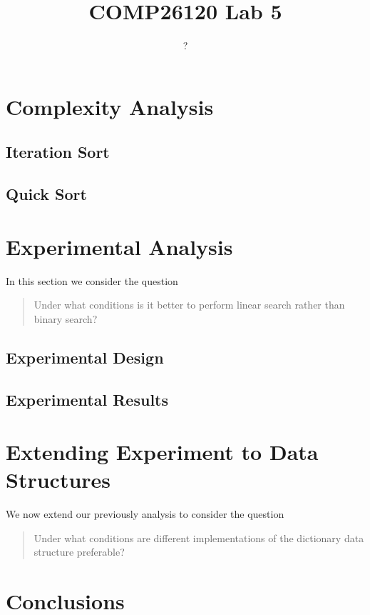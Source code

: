 \documentclass{article}
\title{COMP26120 Lab 5}
\author{?}
\begin{document}
\maketitle


\section{Complexity Analysis}
\label{sec:complexity}


\subsection{Iteration Sort}

\subsection{Quick Sort}


\section{Experimental Analysis}
\label{sec:initialExperiments}

In this section we consider the question
	\begin{quote}
	Under what conditions is it better to perform linear search rather than binary search?
	\end{quote}

\subsection{Experimental Design}

\subsection{Experimental Results}



\section{Extending Experiment to Data Structures}
\label{sec:part3}

We now extend our previously analysis to consider the question
\begin{quote}
Under what conditions are different implementations of the dictionary data structure preferable?
\end{quote}

\section{Conclusions}
\label{sec:conclusions}
\end{document}
